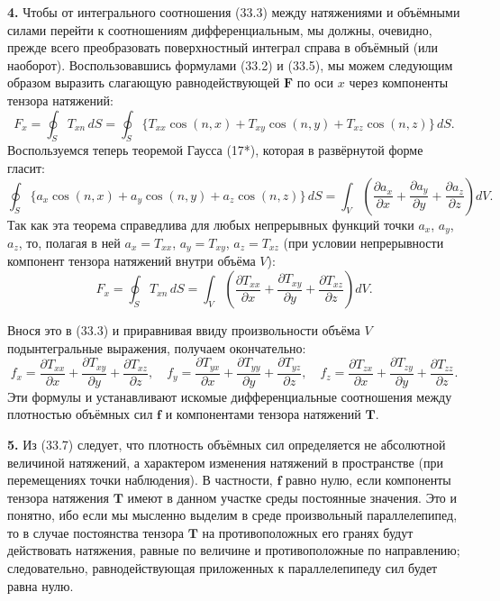 \documentclass[a4paper,12pt]{article}
\begin{document}
\textbf{4.} Чтобы от интегрального соотношения (33.3) между натяжениями
и объёмными силами перейти к соотношениям дифференциальным, мы должны,
очевидно, прежде всего преобразовать поверхностный интеграл справа
в объёмный (или наоборот). Воспользовавшись формулами (33.2) и (33.5),
мы можем следующим образом выразить слагающую равнодействующей
$\mathbf{F}$ по оси $x$ через компоненты тензора натяжений:
$$
    F_x = \oint_S T_{xn}\,dS
        = \oint_S \{T_{xx}\cos(n,x) + T_{xy}\cos(n,y) + T_{xz}\cos(n,z)\}\,dS.
$$
Воспользуемся теперь теоремой Гаусса (17*), которая в развёрнутой
форме гласит:
$$
    \oint_S \{a_x\cos(n,x) + a_y\cos(n,y) + a_z\cos(n,z)\}\,dS
    = \int_V\!\left(
        \frac{\partial a_x}{\partial x}
      + \frac{\partial a_y}{\partial y}
      + \frac{\partial a_z}{\partial z}
    \right)dV.
$$
Так как эта теорема справедлива для любых непрерывных функций точки
$a_x$, $a_y$, $a_z$, то, полагая в ней $a_x = T_{xx}$, $a_y = T_{xy}$,
$a_z = T_{xz}$ (при условии непрерывности компонент тензора натяжений
внутри объёма $V$):
$$
    F_x = \oint_S T_{xn}\,dS
        = \int_V\!\left(
            \frac{\partial T_{xx}}{\partial x}
          + \frac{\partial T_{xy}}{\partial y}
          + \frac{\partial T_{xz}}{\partial z}
          \right)dV.
$$


Внося это в (33.3) и приравнивая ввиду произвольности объёма $V$
подынтегральные выражения, получаем окончательно:
\begin{equation}
    f_x = \frac{\partial T_{xx}}{\partial x}
        + \frac{\partial T_{xy}}{\partial y}
        + \frac{\partial T_{xz}}{\partial z},
    \quad
    f_y = \frac{\partial T_{yx}}{\partial x}
        + \frac{\partial T_{yy}}{\partial y}
        + \frac{\partial T_{yz}}{\partial z},
    \quad
    f_z = \frac{\partial T_{zx}}{\partial x}
        + \frac{\partial T_{zy}}{\partial y}
        + \frac{\partial T_{zz}}{\partial z}.
    \tag{33.7}
\end{equation}
Эти формулы и устанавливают искомые дифференциальные соотношения между
плотностью объёмных сил $\mathbf{f}$ и компонентами тензора натяжений
$\mathbf{T}$.

\textbf{5.} Из (33.7) следует, что плотность объёмных сил определяется
не абсолютной величиной натяжений, а характером изменения натяжений
в пространстве (при перемещениях точки наблюдения). В частности,
$\mathbf{f}$ равно нулю, если компоненты тензора натяжения $\mathbf{T}$
имеют в данном участке среды постоянные значения. Это и понятно, ибо
если мы мысленно выделим в среде произвольный параллелепипед, то в
случае постоянства тензора $\mathbf{T}$ на противоположных его гранях
будут действовать натяжения, равные по величине и противоположные по
направлению; следовательно, равнодействующая приложенных к
параллелепипеду сил будет равна нулю.
\end{document}
